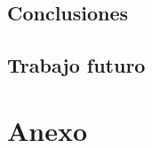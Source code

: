 \documentclass[a4paper, oneside, 11pt]{book}
\begin{document}
		\section{Conclusiones}
		
		
		\section{Trabajo futuro}
		
	
	\chapter{Anexo}\label{chap:anexo}
	
	
	
	
	\renewcommand{\refname}{\section{Bibliografía}}
	
	
	
	
	
\end{document}
